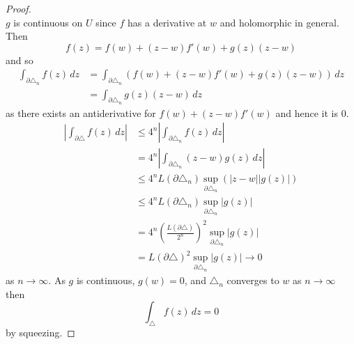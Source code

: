 \begin{proof}
\[    \]
    $g$ is continuous on $U$ since $f$ has a derivative at $w$ and
    holomorphic in general.
    Then
    \[
        f(z) = f(w) + (z- w)f'(w) + g(z)(z - w)
    \]
    and so
    \begin{align*}
        \int_{\partial \triangle_n} f(z) \,dz
        &= \int_{\partial\triangle_n} 
            \left( f(w) + (z - w) f'(w) + g(z)(z - w) \right) \,dz \\
        &= \int_{\partial\triangle_n} g(z)(z - w)\,dz
    \end{align*}
    as there exists an antiderivative for $f(w) + (z-w)f'(w)$
    and hence it is 0.  %
    \begin{align*}
            \left\lvert
                \int_{\partial\triangle} f(z) \,dz
            \right\rvert
        &\leq 4^n
            \left\lvert 
                \int_{\partial\triangle_n} f(z) \,dz
            \right\rvert
            \\
        &= 4^n
            \left\lvert
                \int_{\partial\triangle_n} (z - w) g(z) \,dz
            \right\rvert
                \\
        &\leq 4^n L(\partial\triangle_n) 
            \sup_{\partial\triangle_n} 
            \left(
                \lvert z - w \rvert 
                \lvert g(z) \rvert
            \right)
            \\
        &\leq 4^n L(\partial\triangle_n) \sup_{\partial\triangle_n} \lvert g(z) \rvert
            \\
        &= 4^n \left( \frac{L(\partial\triangle)}{2^n} \right)^2
            \sup_{\partial\triangle_n} \lvert g(z) \rvert \\
        &= L(\partial\triangle)^2 \sup_{\partial\triangle_n} \lvert g(z) \rvert
            \to 0
    \end{align*}
    as $n \to \infty$.
    As $g$ is continuous, $g(w) = 0$, and $\triangle_n$ converges to $w$ as
    $n \to \infty$
    then 
    \[
        \int_{\triangle} f(z) \,dz = 0
    \]
    by squeezing.
\end{proof}
